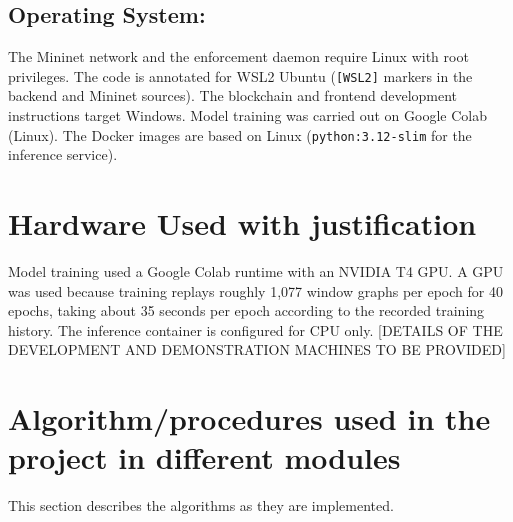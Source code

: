 \documentclass[12pt,a4paper]{report}
\begin{document}
\subsection{Operating System:}
\par The Mininet network and the enforcement daemon require Linux with root privileges. The code is annotated for WSL2 Ubuntu (\texttt{[WSL2]} markers in the backend and Mininet sources). The blockchain and frontend development instructions target Windows. Model training was carried out on Google Colab (Linux). The Docker images are based on Linux (\texttt{python:3.12-slim} for the inference service).

\section{Hardware Used with justification}
\par Model training used a Google Colab runtime with an NVIDIA T4 GPU. A GPU was used because training replays roughly 1{,}077 window graphs per epoch for 40 epochs, taking about 35 seconds per epoch according to the recorded training history. The inference container is configured for CPU only. [DETAILS OF THE DEVELOPMENT AND DEMONSTRATION MACHINES TO BE PROVIDED]

\section{Algorithm/procedures used in the project in different modules }
\par This section describes the algorithms as they are implemented.
\end{document}
